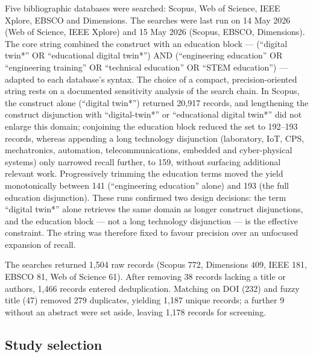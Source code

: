 Five bibliographic databases were searched: Scopus, Web of Science, IEEE Xplore,
EBSCO and Dimensions. The searches were last run on 14 May 2026 (Web of
Science, IEEE Xplore) and 15 May 2026 (Scopus, EBSCO, Dimensions). The core string combined the construct with an education
block --- (``digital twin*'' OR ``educational digital twin*'') AND (``engineering
education'' OR ``engineering training'' OR ``technical education'' OR ``STEM
education'') --- adapted to each database's syntax. The choice of a compact,
precision-oriented string rests on a documented sensitivity analysis of the
search chain. In Scopus, the construct alone (``digital twin*'') returned 20,917
records, and lengthening the construct disjunction with ``digital-twin*'' or
``educational digital twin*'' did not enlarge this domain; conjoining the
education block reduced the set to 192--193 records, whereas appending a long
technology disjunction (laboratory, IoT, CPS, mechatronics, automation,
telecommunications, embedded and cyber-physical systems) only narrowed recall
further, to 159, without surfacing additional relevant work. Progressively
trimming the education terms moved the yield monotonically between 141
(``engineering education'' alone) and 193 (the full education disjunction). These
runs confirmed two design decisions: the term ``digital twin*'' alone retrieves
the same domain as longer construct disjunctions, and the education block --- not a
long technology disjunction --- is the effective constraint. The string was
therefore fixed to favour precision over an unfocused expansion of recall.

The searches returned 1,504 raw records (Scopus 772, Dimensions 409, IEEE 181,
EBSCO 81, Web of Science 61). After removing 38 records lacking a title or
authors, 1,466 records entered deduplication. Matching on DOI (232) and fuzzy
title (47) removed 279 duplicates, yielding 1,187 unique records; a further 9
without an abstract were set aside, leaving 1,178 records for screening.

\subsection{Study selection}\label{study-selection}

